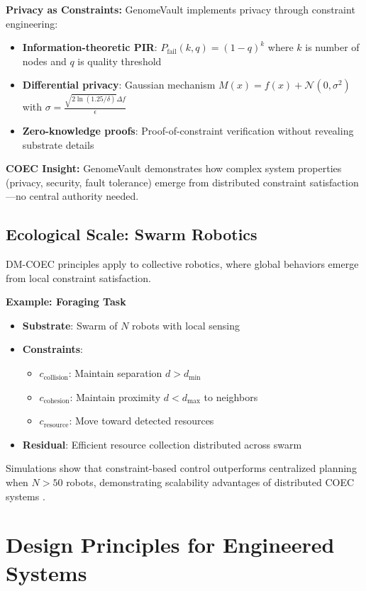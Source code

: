 \documentclass[11pt]{article}
\begin{document}
\textbf{Privacy as Constraints:} GenomeVault implements privacy through constraint engineering:
\begin{itemize}
\item \textbf{Information-theoretic PIR}: $P_{\text{fail}}(k,q) = (1-q)^k$ where $k$ is number of nodes and $q$ is quality threshold
\item \textbf{Differential privacy}: Gaussian mechanism $M(x) = f(x) + \mathcal{N}(0, \sigma^2)$ with $\sigma = \frac{\sqrt{2\ln(1.25/\delta)}\Delta f}{\epsilon}$
\item \textbf{Zero-knowledge proofs}: Proof-of-constraint verification without revealing substrate details
\end{itemize}

\textbf{COEC Insight:} GenomeVault demonstrates how complex system properties (privacy, security, fault tolerance) emerge from distributed constraint satisfaction—no central authority needed.

\subsection{Ecological Scale: Swarm Robotics}

DM-COEC principles apply to collective robotics, where global behaviors emerge from local constraint satisfaction.

\textbf{Example: Foraging Task}
\begin{itemize}
\item \textbf{Substrate}: Swarm of $N$ robots with local sensing
\item \textbf{Constraints}:
  \begin{itemize}
  \item $c_{\text{collision}}$: Maintain separation $d > d_{\text{min}}$
  \item $c_{\text{cohesion}}$: Maintain proximity $d < d_{\text{max}}$ to neighbors
  \item $c_{\text{resource}}$: Move toward detected resources
  \end{itemize}
\item \textbf{Residual}: Efficient resource collection distributed across swarm
\end{itemize}

Simulations show that constraint-based control outperforms centralized planning when $N > 50$ robots, demonstrating scalability advantages of distributed COEC systems \citep{brambilla2013swarm}.

\section{Design Principles for Engineered Systems}
\label{sec:design}
\end{document}
